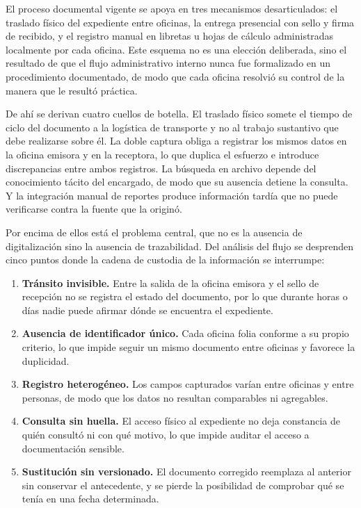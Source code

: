 El proceso documental vigente se apoya en tres mecanismos desarticulados: el traslado físico del expediente entre oficinas, la entrega presencial con sello y firma de recibido, y el registro manual en libretas u hojas de cálculo administradas localmente por cada oficina. Este esquema no es una elección deliberada, sino el resultado de que el flujo administrativo interno nunca fue formalizado en un procedimiento documentado, de modo que cada oficina resolvió su control de la manera que le resultó práctica.

De ahí se derivan cuatro cuellos de botella. El traslado físico somete el tiempo de ciclo del documento a la logística de transporte y no al trabajo sustantivo que debe realizarse sobre él. La doble captura obliga a registrar los mismos datos en la oficina emisora y en la receptora, lo que duplica el esfuerzo e introduce discrepancias entre ambos registros. La búsqueda en archivo depende del conocimiento tácito del encargado, de modo que su ausencia detiene la consulta. Y la integración manual de reportes produce información tardía que no puede verificarse contra la fuente que la originó.

Por encima de ellos está el problema central, que no es la ausencia de digitalización sino la ausencia de trazabilidad. Del análisis del flujo se desprenden cinco puntos donde la cadena de custodia de la información se interrumpe:

\begin{enumerate}[nosep]
  \item \textbf{Tránsito invisible.} Entre la salida de la oficina emisora y el sello de recepción no se registra el estado del documento, por lo que durante horas o días nadie puede afirmar dónde se encuentra el expediente.
  \item \textbf{Ausencia de identificador único.} Cada oficina folia conforme a su propio criterio, lo que impide seguir un mismo documento entre oficinas y favorece la duplicidad.
  \item \textbf{Registro heterogéneo.} Los campos capturados varían entre oficinas y entre personas, de modo que los datos no resultan comparables ni agregables.
  \item \textbf{Consulta sin huella.} El acceso físico al expediente no deja constancia de quién consultó ni con qué motivo, lo que impide auditar el acceso a documentación sensible.
  \item \textbf{Sustitución sin versionado.} El documento corregido reemplaza al anterior sin conservar el antecedente, y se pierde la posibilidad de comprobar qué se tenía en una fecha determinada.
\end{enumerate}

